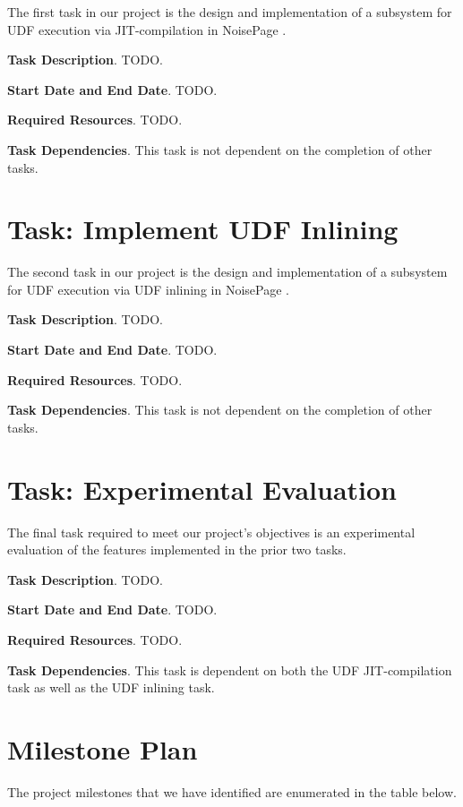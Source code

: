 \documentclass{vldb}
\begin{document}
The first task in our project is the design and implementation of a subsystem for UDF execution via JIT-compilation in NoisePage \cite{noisepage}.

\textbf{Task Description}. TODO.

\textbf{Start Date and End Date}. TODO.

\textbf{Required Resources}. TODO.

\textbf{Task Dependencies}. This task is not dependent on the completion of other tasks.

\section{Task: Implement UDF Inlining}

The second task in our project is the design and implementation of a subsystem for UDF execution via UDF inlining in NoisePage \cite{noisepage}.

\textbf{Task Description}. TODO.

\textbf{Start Date and End Date}. TODO.

\textbf{Required Resources}. TODO.

\textbf{Task Dependencies}. This task is not dependent on the completion of other tasks.

\section{Task: Experimental Evaluation}

The final task required to meet our project's objectives is an experimental evaluation of the features implemented in the prior two tasks.

\textbf{Task Description}. TODO.

\textbf{Start Date and End Date}. TODO.

\textbf{Required Resources}. TODO.

\textbf{Task Dependencies}. This task is dependent on both the UDF JIT-compilation task as well as the UDF inlining task.


\section{Milestone Plan}

The project milestones that we have identified are enumerated in the table below.


\newcommand{\newblock}{}

\newpage


\end{document}
